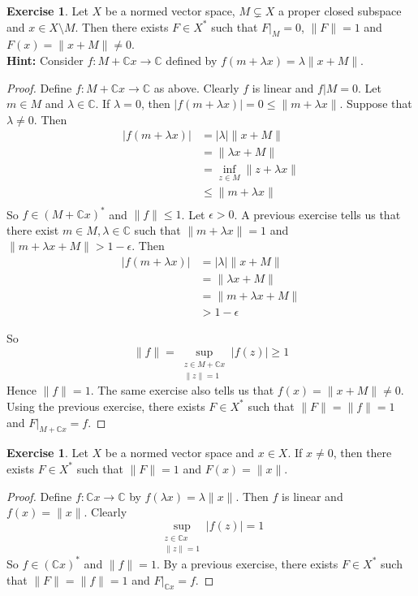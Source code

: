 \documentclass[12pt]{amsart}
\theoremstyle{definition}
\theoremstyle{remark}
\theoremstyle{definition}
\newtheorem{ex}[definition]{Exercise}
\newcommand{\lam}{\lambda}
\newcommand{\ep}{\epsilon}
\newcommand{\C}{\mathbb{C}}
\begin{document}
	\begin{ex}
		Let $X$ be a normed vector space, $M \subsetneq X$ a proper closed subspace and $x \in X \setminus M$. Then there exists $F \in X^*$ such that $F|_M = 0$, $\|F \|=1$ and $ F(x) = \|x+M \|\neq 0$. \\
		\textbf{Hint:} Consider $f:M+\C x \rightarrow \C$ defined by $f(m+\lam x) = \lam \|x +M \|$.
	\end{ex}
	
	\begin{proof}
		Define $f:M+\C x \rightarrow \C$ as above. Clearly $f$ is linear and $f|M = 0$. Let $m \in M$ and $\lam \in \C$. If $\lam = 0$, then $\vert f(m +\lam x) \vert = 0 \leq \|m+ \lam x \|$. Suppose that $\lam \neq 0$. Then 
		\begin{align*}
			\vert f(m+\lam x) \vert 
			& = \vert \lam \vert \|x+M \|\\
			& =  \|\lam x+M \|\\
			& = \inf_{z \in M} \|z+ \lam x \|\\
			& \leq  \|m+ \lam x  \|\\
		\end{align*} 
		So $f \in (M+\C x )^*$ and $\|f \|\leq 1$. Let $\ep >0$. A previous exercise tells us that there exist $m \in M, \lam \in \C$ such that $\|m+ \lam x \|= 1$ and $\|m+ \lam x +M \|> 1- \ep$. Then 
		\begin{align*}
			\vert f(m + \lam x) \vert
			&= \vert \lam \vert \|x+M\|\\
			&=\|\lam x +M \|\\
			&= \|m + \lam x +M \|\\
			&> 1-\ep
		\end{align*}
		
		So $$ \|f \|= \sup_{\substack{z \in M + \C x \\ \|z \|=1}} \vert f(z) \vert \geq 1$$ Hence $\|f \|=1$. 
		The same exercise also tells us that $f(x) = \|x+M\|\neq 0$. Using the previous exercise, there exists $F \in X^*$ such that $\|F \|= \|f \|= 1$ and $F|_{M+\C x} = f$.
	\end{proof}
	
	\begin{ex}
		Let $X$ be a normed vector space and $x \in X$. If $x \neq 0$, then there exists $F \in X^*$ such that $\|F \|= 1$ and $F(x) = \|x \|$.
	\end{ex}
	
	\begin{proof}
		Define $f:\C x \rightarrow \C$ by $f(\lam x) = \lam \|x \|$. Then $f$ is linear and $f(x) = \|x \|$. Clearly $$\sup_{\substack{z \in \C x \\ \|z \|=1}}\vert f(z) \vert = 1$$ 
		So $f \in (\C x)^*$ and $\|f \|= 1$. By a previous exercise, there exists $F \in X^*$ such that $\|F \|= \|f \|=1$ and $F|_{\C x} = f$. 
	\end{proof}
	
\end{document}
